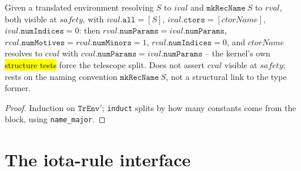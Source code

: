 \begin{theorem}
\label{thm:tr-env-structure-rec}
\leanok
{}

 Given a translated environment resolving $S$ to $ival$ and
$\mathtt{mkRecName}\ S$ to $rval$, both visible at $safety$, with
$ival.\mathtt{all} = [S]$, $ival.\mathtt{ctors} = [ctorName]$,
$ival.\mathtt{numIndices} = 0$: then $rval.\mathtt{numParams} = ival.\mathtt{numParams}$,
$rval.\mathtt{numMotives} = rval.\mathtt{numMinors} = 1$, $rval.\mathtt{numIndices} = 0$,
and $ctorName$ resolves to $cval$ with $cval.\mathtt{numParams} = ival.\mathtt{numParams}$
-- the kernel's own \hl{structure tests} force the telescope split.
 Does not assert $cval$ visible at $safety$; rests on the naming convention
$\mathtt{mkRecName}\ S$, not a structural link to the type former.
\end{theorem}
\begin{proof}
\leanok
{} Induction on $\mathtt{TrEnv}'$; \texttt{induct} splits by how many constants
come from the block, using \texttt{name\_major}.
\end{proof}

\section{The iota-rule interface}

